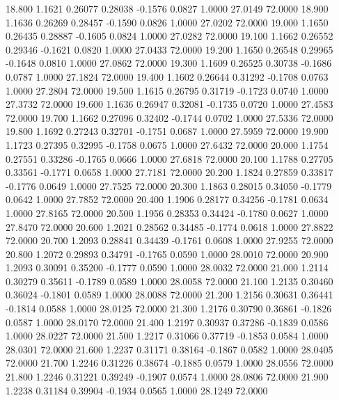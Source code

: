   18.800   1.1621   0.26077   0.28038  -0.1576   0.0827   1.0000  27.0149  72.0000
  18.900   1.1636   0.26269   0.28457  -0.1590   0.0826   1.0000  27.0202  72.0000
  19.000   1.1650   0.26435   0.28887  -0.1605   0.0824   1.0000  27.0282  72.0000
  19.100   1.1662   0.26552   0.29346  -0.1621   0.0820   1.0000  27.0433  72.0000
  19.200   1.1650   0.26548   0.29965  -0.1648   0.0810   1.0000  27.0862  72.0000
  19.300   1.1609   0.26525   0.30738  -0.1686   0.0787   1.0000  27.1824  72.0000
  19.400   1.1602   0.26644   0.31292  -0.1708   0.0763   1.0000  27.2804  72.0000
  19.500   1.1615   0.26795   0.31719  -0.1723   0.0740   1.0000  27.3732  72.0000
  19.600   1.1636   0.26947   0.32081  -0.1735   0.0720   1.0000  27.4583  72.0000
  19.700   1.1662   0.27096   0.32402  -0.1744   0.0702   1.0000  27.5336  72.0000
  19.800   1.1692   0.27243   0.32701  -0.1751   0.0687   1.0000  27.5959  72.0000
  19.900   1.1723   0.27395   0.32995  -0.1758   0.0675   1.0000  27.6432  72.0000
  20.000   1.1754   0.27551   0.33286  -0.1765   0.0666   1.0000  27.6818  72.0000
  20.100   1.1788   0.27705   0.33561  -0.1771   0.0658   1.0000  27.7181  72.0000
  20.200   1.1824   0.27859   0.33817  -0.1776   0.0649   1.0000  27.7525  72.0000
  20.300   1.1863   0.28015   0.34050  -0.1779   0.0642   1.0000  27.7852  72.0000
  20.400   1.1906   0.28177   0.34256  -0.1781   0.0634   1.0000  27.8165  72.0000
  20.500   1.1956   0.28353   0.34424  -0.1780   0.0627   1.0000  27.8470  72.0000
  20.600   1.2021   0.28562   0.34485  -0.1774   0.0618   1.0000  27.8822  72.0000
  20.700   1.2093   0.28841   0.34439  -0.1761   0.0608   1.0000  27.9255  72.0000
  20.800   1.2072   0.29893   0.34791  -0.1765   0.0590   1.0000  28.0010  72.0000
  20.900   1.2093   0.30091   0.35200  -0.1777   0.0590   1.0000  28.0032  72.0000
  21.000   1.2114   0.30279   0.35611  -0.1789   0.0589   1.0000  28.0058  72.0000
  21.100   1.2135   0.30460   0.36024  -0.1801   0.0589   1.0000  28.0088  72.0000
  21.200   1.2156   0.30631   0.36441  -0.1814   0.0588   1.0000  28.0125  72.0000
  21.300   1.2176   0.30790   0.36861  -0.1826   0.0587   1.0000  28.0170  72.0000
  21.400   1.2197   0.30937   0.37286  -0.1839   0.0586   1.0000  28.0227  72.0000
  21.500   1.2217   0.31066   0.37719  -0.1853   0.0584   1.0000  28.0301  72.0000
  21.600   1.2237   0.31171   0.38164  -0.1867   0.0582   1.0000  28.0405  72.0000
  21.700   1.2246   0.31226   0.38674  -0.1885   0.0579   1.0000  28.0556  72.0000
  21.800   1.2246   0.31221   0.39249  -0.1907   0.0574   1.0000  28.0806  72.0000
  21.900   1.2238   0.31184   0.39904  -0.1934   0.0565   1.0000  28.1249  72.0000
